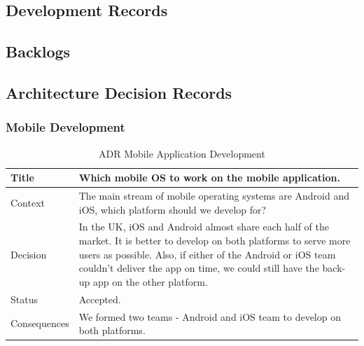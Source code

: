 \documentclass[12pt,a4paper]{article}
\begin{document}
    \begin{appendices}                  
      \section{Development Records}
        \subsection{Backlogs}\label{appendix:backlogs}
          
          
        \subsection{Architecture Decision Records}\label{appendix:Architecture Decision Records}
          \subsubsection{Mobile Development}
            \begin{table}[H]
              \centering
                \begin{tabularx}{\textwidth}{l X}
                  \hline
                  Title & Which mobile OS to work on the mobile application. \\ \hline
                  Context & The main stream of mobile operating systems are Android and iOS, which platform should we develop for?\\ 
                  Decision & In the UK, iOS and Android almost share each half of the market. It is better to develop on both platforms to serve more users as possible. Also, if either of the Android or iOS team couldn't deliver the app on time, we could still have the back-up app on the other platform. \\ 
                  Status & Accepted.\\ 
                  Consequences & We formed two teams - Android and iOS team to develop on both platforms.  \\                  
                  \hline
                \end{tabularx}
                \caption[Table caption text]{ADR Mobile Application Development}
                \label{table:ADR Mobile Application Development}
            \end{table}


\end{appendices}
\end{document}
